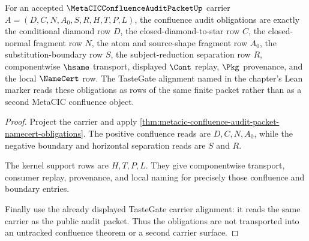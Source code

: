 \begin{theorem}
\label{thm:metacic-confluence-audit-obligation-surface}
For an accepted $\MetaCICConfluenceAuditPacketUp$ carrier
$A=(D,C,N,A_0,S,R,H,T,P,L)$, the confluence audit obligations are exactly the
conditional diamond row $D$, the closed-diamond-to-star row $C$, the
closed-normal fragment row $N$, the atom and source-shape fragment row $A_0$,
the substitution-boundary row $S$, the subject-reduction separation row $R$,
componentwise $\hsame$ transport, displayed $\Cont$ replay, $\Pkg$
provenance, and the local $\NameCert$ row. The TasteGate alignment named in
the chapter's Lean marker reads these obligations as rows of the same finite
packet rather than as a second MetaCIC confluence object.
\end{theorem}
\begin{proof}
Project the carrier and apply
\autoref{thm:metacic-confluence-audit-packet-namecert-obligations}. The
positive confluence reads are $D,C,N,A_0$, while the negative boundary and
horizontal separation reads are $S$ and $R$.

The kernel support rows are $H,T,P,L$. They give componentwise transport,
consumer replay, provenance, and local naming for precisely those confluence
and boundary entries.

Finally use the already displayed TasteGate carrier alignment: it reads the
same carrier as the public audit packet. Thus the obligations are not
transported into an untracked confluence theorem or a second carrier surface.
\end{proof}

